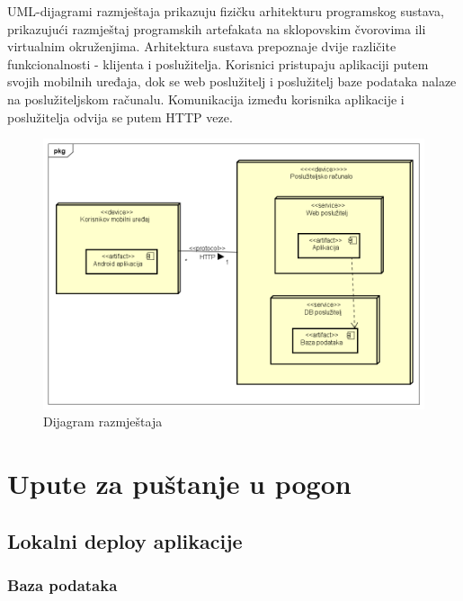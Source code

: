 			UML-dijagrami razmještaja prikazuju fizičku arhitekturu programskog sustava, prikazujući razmještaj programskih artefakata na sklopovskim čvorovima ili virtualnim okruženjima. Arhitektura sustava prepoznaje dvije različite funkcionalnosti - klijenta i poslužitelja. Korisnici pristupaju aplikaciji putem svojih mobilnih uređaja, dok se web poslužitelj i poslužitelj baze podataka nalaze na poslužiteljskom računalu. Komunikacija između korisnika aplikacije i poslužitelja odvija se putem HTTP veze.
			
			 \begin{figure}[H]
			 	\includegraphics[scale=0.6]{dijagrami/dijagramRazmjestaja/dijagramRazmjestaja.PNG} %
			 	\centering
			 	\caption{Dijagram razmještaja}
			 	\label{fig:dRazmjestaja}
			 \end{figure}
			
			\eject 
		
		\section{Upute za puštanje u pogon}
		
		\subsection{Lokalni deploy aplikacije}
		
		\subsubsection{Baza podataka}
		
